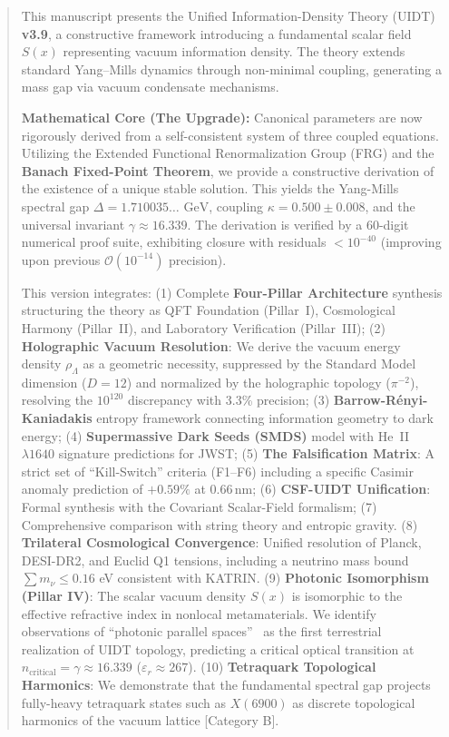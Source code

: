 \documentclass[12pt,a4paper,twoside]{article}
\theoremstyle{plain}
\theoremstyle{definition}
\theoremstyle{remark}
\newcommand{\UIDT}{\textsc{UIDT}}
\newcommand{\GeV}{\,\mathrm{GeV}}
\begin{document}
\begin{abstract}
\noindent
This manuscript presents the Unified Information-Density Theory (\UIDT{})
\textbf{v3.9}, a constructive framework introducing a fundamental
scalar field $S(x)$ representing vacuum information density. The theory extends
standard Yang--Mills dynamics through non-minimal coupling, generating a mass
gap via vacuum condensate mechanisms.

\vspace{0.7em}
\noindent
\textbf{Mathematical Core (The Upgrade):}
Canonical parameters are now rigorously derived from a self-consistent system
of three coupled equations. Utilizing the Extended Functional Renormalization
Group (FRG) and the \textbf{Banach Fixed-Point Theorem}, we provide a
constructive derivation of the existence of a unique stable solution. This yields
the Yang-Mills spectral gap $\Delta = 1.710035\dots\,\GeV$, coupling
$\kappa = 0.500 \pm 0.008$, and the universal invariant
$\gamma \approx 16.339$. The derivation is verified by a 60-digit numerical
proof suite, exhibiting closure with residuals $< 10^{-40}$ (improving upon
previous $\mathcal{O}(10^{-14})$ precision).

\vspace{0.7em}
\noindent
This version integrates:
(1) Complete \textbf{Four-Pillar Architecture} synthesis structuring the
    theory as QFT Foundation (Pillar~I), Cosmological Harmony (Pillar~II),
    and Laboratory Verification (Pillar~III);
(2) \textbf{Holographic Vacuum Resolution}: We derive the vacuum energy density
    $\rho_{\Lambda}$ as a geometric necessity, suppressed by the Standard Model
    dimension ($D=12$) and normalized by the holographic topology ($\pi^{-2}$),
    resolving the $10^{120}$ discrepancy with 3.3\% precision;
(3) \textbf{Barrow-R\'enyi-Kaniadakis} entropy framework connecting information
    geometry to dark energy;
(4) \textbf{Supermassive Dark Seeds (SMDS)} model with He~II $\lambda1640$
    signature predictions for JWST;
(5) \textbf{The Falsification Matrix}: A strict set of ``Kill-Switch'' criteria
    (F1--F6) including a specific Casimir anomaly prediction of $+0.59\%$ at
    $0.66$\,nm;
(6) \textbf{CSF-UIDT Unification}: Formal synthesis with the Covariant
    Scalar-Field formalism;
(7) Comprehensive comparison with string theory and entropic gravity.
(8) \textbf{Trilateral Cosmological Convergence}: Unified resolution of Planck, DESI-DR2, and Euclid Q1 tensions, including a neutrino mass bound $\sum m_\nu \le 0.16$ eV consistent with KATRIN.
(9) \textbf{Photonic Isomorphism (Pillar IV)}: The scalar vacuum density $S(x)$ is
    isomorphic to the effective refractive index in nonlocal metamaterials. We
    identify observations of ``photonic parallel spaces''~\cite{SongEtAl2025} as
    the first terrestrial realization of UIDT topology, predicting a critical
    optical transition at $n_{\mathrm{critical}} = \gamma \approx 16.339$
    ($\varepsilon_r \approx 267$).
(10) \textbf{Tetraquark Topological Harmonics}: We demonstrate that the fundamental spectral gap projects fully-heavy tetraquark states such as $X(6900)$ as discrete topological harmonics of the vacuum lattice [Category B].


\end{abstract}
\end{document}
